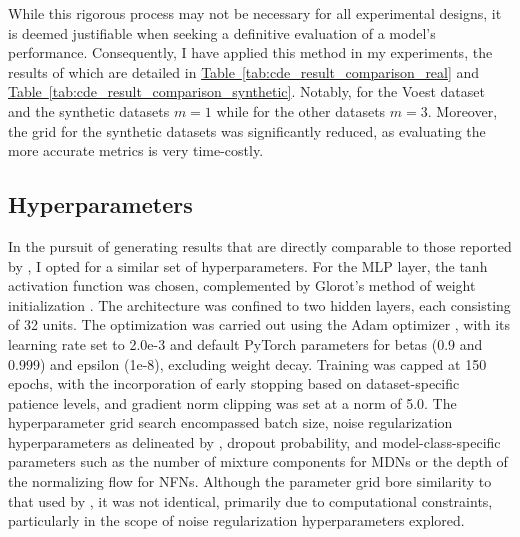 \documentclass{article}
\newcommand\tef[1]{\hyperref[#1]{Table~\ref{#1}}}
\begin{document}
While this rigorous process may not be necessary for all experimental designs, it is deemed justifiable when seeking a definitive evaluation of a model's performance. Consequently, I have applied this method in my experiments, the results of which are detailed in \tef{tab:cde_result_comparison_real} and \tef{tab:cde_result_comparison_synthetic}. Notably, for the Voest dataset and the synthetic datasets $m=1$ while for the other datasets $m=3$. Moreover, the grid for the synthetic datasets was significantly reduced, as evaluating the more accurate metrics is very time-costly.

\subsection{Hyperparameters}
In the pursuit of generating results that are directly comparable to those reported by \citep{rothfuss2019noise}, I opted for a similar set of hyperparameters. For the MLP layer, the tanh activation function was chosen, complemented by Glorot's method of weight initialization \citep{glorot2010understanding}. The architecture was confined to two hidden layers, each consisting of 32 units. The optimization was carried out using the Adam optimizer \citep{kingma2014adam}, with its learning rate set to 2.0e-3 and default PyTorch parameters for betas (0.9 and 0.999) and epsilon (1e-8), excluding weight decay. Training was capped at 150 epochs, with the incorporation of early stopping based on dataset-specific patience levels, and gradient norm clipping was set at a norm of 5.0. The hyperparameter grid search encompassed batch size, noise regularization hyperparameters as delineated by \citep{rothfuss2019noise}, dropout probability, and model-class-specific parameters such as the number of mixture components for MDNs or the depth of the normalizing flow for NFNs. Although the parameter grid bore similarity to that used by \citep{rothfuss2019noise}, it was not identical, primarily due to computational constraints, particularly in the scope of noise regularization hyperparameters explored.
\end{document}
